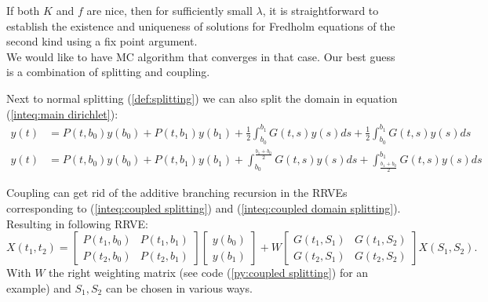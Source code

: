 \documentclass[a4paper,12pt]{article}
\begin{document}

If both $K$ and $f$ are nice, then for sufficiently small $\lambda$,
it is straightforward to establish the existence and uniqueness of solutions
for Fredholm equations of the second kind using a fix point argument. \\


We would like to have MC algorithm that converges in that case. Our best guess is
a combination of splitting and coupling.


\begin{example} \label{ex:coupled splitting}
    Next to normal splitting (\ref{def:splitting}) we can
    also split the domain in equation (\ref{inteq:main dirichlet}):
    \begin{align}\label{inteq:coupled splitting}
        y(t) & = P(t,b_{0}) y(b_{0}) + P(t,b_{1}) y(b_{1}) +
        \frac{1}{2} \int_{b_{0}}^{b_{1}} G(t,s)y(s) ds +
        \frac{1}{2} \int_{b_{0}}^{b_{1}} G(t,s)y(s) ds                                              \\
        y(t) & = P(t,b_{0}) y(b_{0}) + P(t,b_{1}) y(b_{1}) + \label{inteq:coupled domain splitting}
        \int_{b_{0}}^{\frac{b_{1}+b_{0}}{2}} G(t,s)y(s) ds +
        \int_{\frac{b_{1}+b_{0}}{2}}^{b_{1}} G(t,s)y(s) ds
    \end{align}

    Coupling can get rid of the additive branching recursion in the RRVEs corresponding
    to (\ref{inteq:coupled splitting}) and (\ref{inteq:coupled domain splitting}).
    Resulting in following RRVE:
    \begin{equation} \label{RRVE:coupled splitting}
        X(t_{1},t_{2})=
        \begin{bmatrix}
            P(t_{1},b_{0}) & P(t_{1},b_{1}) \\
            P(t_{2},b_{0}) & P(t_{2},b_{1})
        \end{bmatrix}
        \begin{bmatrix}
            y(b_{0}) \\
            y(b_{1})
        \end{bmatrix}
        +
        W
        \begin{bmatrix}
            G(t_{1},S_{1}) & G(t_{1},S_{2}) \\
            G(t_{2},S_{1}) & G(t_{2},S_{2})
        \end{bmatrix}
        X(S_{1},S_{2}).
    \end{equation}
    With $W$ the right weighting matrix (see code (\ref{py:coupled splitting}) for an example)
    and $S_{1},S_{2}$ can be chosen in various ways.
\end{example}
\end{document}
